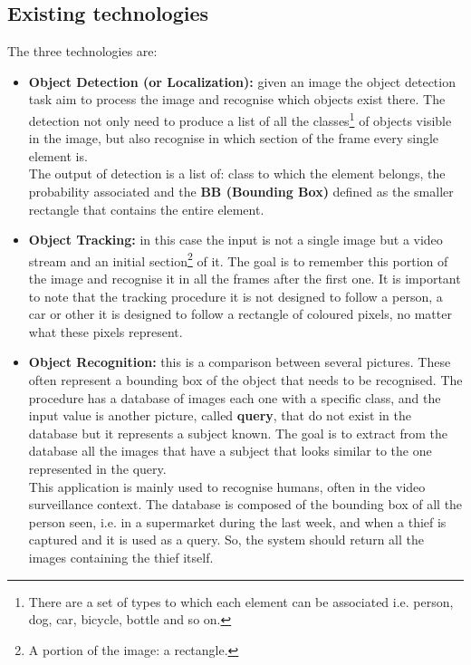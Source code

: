 \subsection{Existing technologies}\label{sec:existingTechnologies}
The three technologies are:
\begin{itemize}
	\item \textbf{Object Detection (or Localization):} given an image the object detection task aim to process the image and recognise which objects exist there. The detection not only need to produce a list of all the classes\footnote{There are a set of types to which each element can be associated i.e. person, dog, car, bicycle, bottle and so on.} of objects visible in the image, but also recognise in which section of the frame every single element is.\\
	The output of detection is a list of: class to which the element belongs, the probability associated and the \textbf{BB (Bounding Box)} defined as the smaller rectangle that contains the entire element.

	\item \textbf{Object Tracking:} in this case the input is not a single image but a video stream and an initial section\footnote{A portion of the image: a rectangle.} of it. The goal is to remember this portion of the image and recognise it in all the frames after the first one. It is important to note that the tracking procedure it is not designed to follow a person, a car or other it is designed to follow a rectangle of coloured pixels, no matter what these pixels represent.

	\item \textbf{Object Recognition:} this is a comparison between several pictures. These often represent a bounding box of the object that needs to be recognised. The procedure has a database of images each one with a specific class, and the input value is another picture, called \textbf{query}, that do not exist in the database but it represents a subject known. The goal is to extract from the database all the images that have a subject that looks similar to the one represented in the query.\\
	This application is mainly used to recognise humans, often in the video surveillance context. The database is composed of the bounding box of all the person seen, i.e. in a supermarket during the last week, and when a thief is captured and it is used as a query. So, the system should return all the images containing the thief itself.
\end{itemize}

